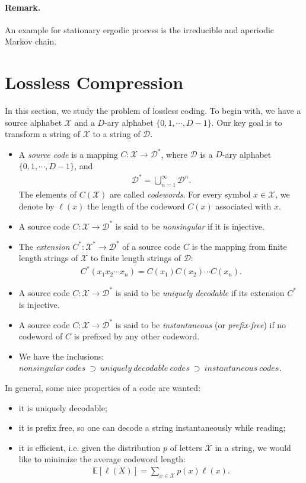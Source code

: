 \documentclass{article}
\numberwithin{equation}{section}
\newcommand{\E}{\mathbb{E}}
\renewcommand{\cal}{\mathcal}
\theoremstyle{plain}
\theoremstyle{definition}
\begin{document}
\paragraph{Remark.} An example for stationary ergodic process is the irreducible and aperiodic Markov chain.
\newpage
\section{Lossless Compression}
In this section, we study the problem of lossless coding. To begin with, we have a source alphabet $\cal{X}$ and a $D$-ary alphabet $\{0,1,\cdots,D-1\}$. Our key goal is to transform a string of $\cal{X}$ to a string of $\cal{D}$.
\begin{itemize}
\item A \textit{source code} is a mapping $C:\cal{X}\to\cal{D}^*$, where $\cal{D}$ is a $D$-ary alphabet $\{0,1,\cdots,D-1\}$, and
\begin{align*}
	\cal{D}^*=\bigcup_{n=1}^\infty\cal{D}^n.
\end{align*}
The elements of $C(\cal{X})$ are called \textit{codewords}. For every symbol $x\in\cal{X}$, we denote by $\ell(x)$ the length of the codeword $C(x)$ associated with $x$.
\item A source code $C:\cal{X}\to\cal{D}^*$ is said to be \textit{nonsingular} if it is injective.
\item The \textit{extension} $C^*:\cal{X}^*\to\cal{D}^*$ of a source code $C$ is the mapping from finite length strings of $\cal{X}$ to finite length strings of $\cal{D}$:
\begin{align*}
	C^*(x_1x_2\cdots x_n)=C(x_1)C(x_2)\cdots C(x_n).
\end{align*}
\item A source code $C:\cal{X}\to\cal{D}^*$ is said to be \textit{uniquely decodable} if its extension $C^*$ is injective.
\item A source code $C:\cal{X}\to\cal{D}^*$ is said to be \textit{instantaneous} (or \textit{prefix-free}) if no codeword of $C$ is prefixed by any other codeword.
\item We have the inclusions: $nonsingular\ codes\ \supset\ uniquely\ decodable\ codes\ \supset\ instantaneous\ codes$.
\end{itemize}
In general, some nice properties of a code are wanted:
\begin{itemize}
	\item it is uniquely decodable;
	\item it is prefix free, so one can decode a string instantaneously while reading;
	\item it is efficient, i.e. given the distribution $p$ of letters $\cal{X}$ in a string, we would like to minimize the average codeword length:
	\begin{align*}
		\E\left[\ell(X)\right]=\sum_{x\in\cal{X}}p(x)\ell(x).
	\end{align*}
\end{itemize}
\end{document}
